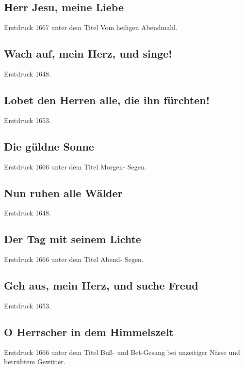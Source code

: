 \subsection*{ Herr Jesu, meine Liebe}

Erstdruck 1667 unter dem Titel \frqq Vom heiligen Abendmahl\flqq .

\subsection*{ Wach auf, mein Herz, und singe!}

Erstdruck 1648.

\subsection*{ Lobet den Herren alle, die ihn fürchten!}

Erstdruck 1653.

\subsection*{ Die güldne Sonne}

Erstdruck 1666 unter dem Titel \frqq Morgen- Segen\flqq .

\subsection*{ Nun ruhen alle Wälder}

Erstdruck 1648.

\subsection*{ Der Tag mit seinem Lichte}

Erstdruck 1666 unter dem Titel \frqq Abend- Segen\flqq .

\subsection*{ Geh aus, mein Herz, und suche Freud}

Erstdruck 1653.

\subsection*{ O Herrscher in dem Himmelszelt}

Erstdruck 1666 unter dem Titel \frqq Buß- und Bet-Gesang bei unzeitiger Nässe
und betrübtem Gewitter\flqq .

